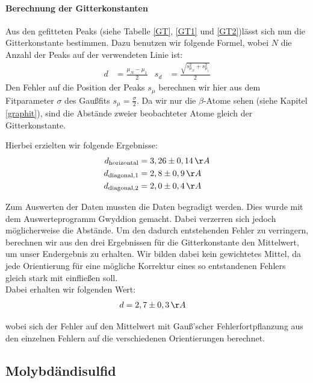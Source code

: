 \documentclass[12pt,listof=totoc]{scrartcl}
\begin{document}
\paragraph{Berechnung der Gitterkonstanten}

Aus den gefitteten Peaks (siehe Tabelle \ref{GT}, \ref{GT1} und \ref{GT2})lässt sich nun die Gitterkonstante bestimmen. Dazu benutzen wir folgende Formel, wobei $N$ die Anzahl der Peaks auf der verwendeten Linie ist: 
\begin{align*}
	d&=\frac{\mu_{N}-\mu_1}{2}&s_d&=\frac{\sqrt{s_{\mu_N}^2+s_{\mu_1}^2}}{2}
\end{align*}
Den Fehler auf die Position der Peaks $s_{\mu}$ berechnen wir hier aus dem Fitparameter $\sigma$ des Gaußfits $s_{\mu}=\frac{\sigma}{2}$. Da wir nur die $\beta$-Atome sehen (siehe Kapitel \ref{graphit}), sind die Abstände zweier beobachteter Atome gleich der Gitterkonstante.

Hierbei erzielten wir folgende Ergebnisse:
\begin{align*}
	d_{\text{horizontal}}&=3,26\pm0,14\,\AA\\
	d_{\text{diagonal},1}&=2,8\pm0,9\,\AA\\
	d_{\text{diagonal},2}&=2,0\pm0,4\,\AA\\
\end{align*}

Zum Auswerten der Daten mussten die Daten begradigt werden. Dies wurde mit dem Auswerteprogramm Gwyddion gemacht. Dabei verzerren sich jedoch möglicherweise die Abstände. Um den dadurch entstehenden Fehler zu verringern, berechnen wir aus den drei Ergebnissen für die Gitterkonstante den Mittelwert, um unser Endergebnis zu erhalten.\label{begradigung} Wir bilden dabei kein gewichtetes Mittel, da jede Orientierung für eine mögliche Korrektur eines so entstandenen Fehlers gleich stark mit einfließen soll.\\

Dabei erhalten wir folgenden Wert:
\begin{align*}
	d&=2,7\pm0,3\,\AA
\end{align*}

wobei sich der Fehler auf den Mittelwert mit Gauß'scher Fehlerfortpflanzung aus den einzelnen Fehlern auf die verschiedenen Orientierungen berechnet.

\newpage
\subsection{Molybdändisulfid}
\end{document}
